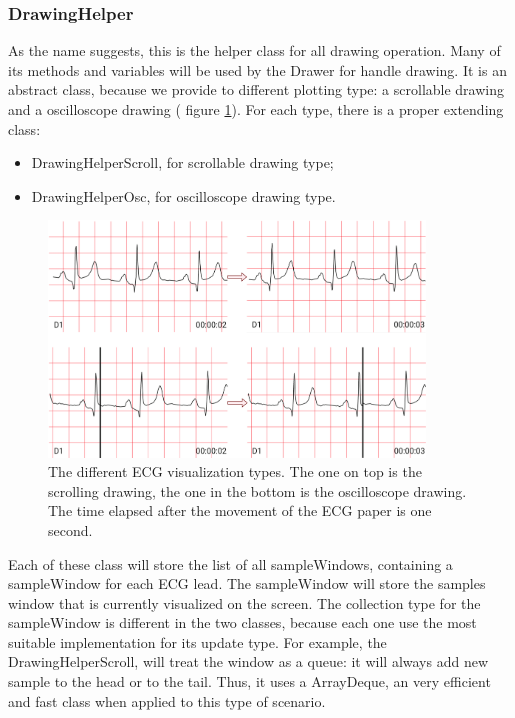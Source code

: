 \subsubsection{DrawingHelper}
As the name suggests, this is the helper class for all drawing operation. Many of its methods and variables will be used by the Drawer for handle drawing. It is an abstract class, because we provide to different plotting type: a scrollable drawing and a oscilloscope drawing ( figure \ref{fig9.9}). For each type, there is a proper extending  class:
\begin{itemize}
	\item DrawingHelperScroll, for scrollable drawing type;
	\item DrawingHelperOsc, for oscilloscope drawing type.
\end{itemize}
\begin{figure}[ht!]
	\centering
	\includegraphics[width=100mm]{figures/ch9/9.png}
	\caption{The different ECG visualization types. The one on top is the scrolling drawing, the one in the bottom is the oscilloscope drawing. The time elapsed after the movement of the ECG paper is one second.}
	\label{fig9.9}
\end{figure}
Each of these class will store the list of all sampleWindows, containing a sampleWindow for each ECG lead. The sampleWindow will store the samples window that is currently visualized on the screen. The collection type for the sampleWindow is different in the two classes, because each one use the most suitable implementation for its update type. For example, the DrawingHelperScroll, will treat the window as a queue: it will always add new sample to the head or to the tail. Thus, it uses a ArrayDeque, an very efficient and fast class when applied to this type of scenario.\\
